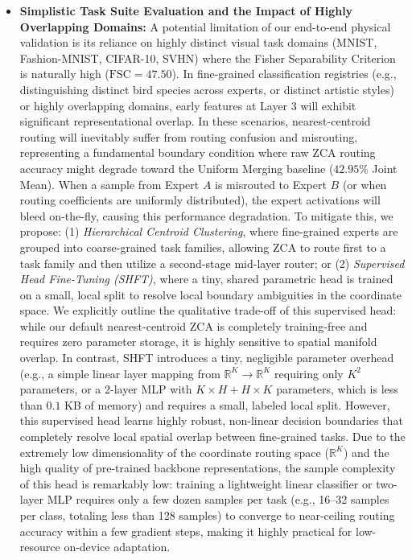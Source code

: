 \begin{itemize}
    \item \textbf{Simplistic Task Suite Evaluation and the Impact of Highly Overlapping Domains:} A potential limitation of our end-to-end physical validation is its reliance on highly distinct visual task domains (MNIST, Fashion-MNIST, CIFAR-10, SVHN) where the Fisher Separability Criterion is naturally high ($\text{FSC} = 47.50$).
In fine-grained classification registries (e.g., distinguishing distinct bird species across experts, or distinct artistic styles) or highly overlapping domains, early features at Layer 3 will exhibit significant representational overlap.
In these scenarios, nearest-centroid routing will inevitably suffer from routing confusion and misrouting, representing a fundamental boundary condition where raw ZCA routing accuracy might degrade toward the Uniform Merging baseline ($42.95\%$ Joint Mean).
When a sample from Expert $A$ is misrouted to Expert $B$ (or when routing coefficients are uniformly distributed), the expert activations will bleed on-the-fly, causing this performance degradation.
To mitigate this, we propose: (1) \emph{Hierarchical Centroid Clustering}, where fine-grained experts are grouped into coarse-grained task families, allowing ZCA to route first to a task family and then utilize a second-stage mid-layer router; or (2) \emph{Supervised Head Fine-Tuning (SHFT)}, where a tiny, shared parametric head is trained on a small, local split to resolve local boundary ambiguities in the coordinate space.
We explicitly outline the qualitative trade-off of this supervised head: while our default nearest-centroid ZCA is completely training-free and requires zero parameter storage, it is highly sensitive to spatial manifold overlap. In contrast, SHFT introduces a tiny, negligible parameter overhead (e.g., a simple linear layer mapping from $\mathbb{R}^K \to \mathbb{R}^K$ requiring only $K^2$ parameters, or a 2-layer MLP with $K \times H + H \times K$ parameters, which is less than $0.1$ KB of memory) and requires a small, labeled local split. However, this supervised head learns highly robust, non-linear decision boundaries that completely resolve local spatial overlap between fine-grained tasks.
Due to the extremely low dimensionality of the coordinate routing space ($\mathbb{R}^K$) and the high quality of pre-trained backbone representations, the sample complexity of this head is remarkably low: training a lightweight linear classifier or two-layer MLP requires only a few dozen samples per task (e.g., 16--32 samples per class, totaling less than 128 samples) to converge to near-ceiling routing accuracy within a few gradient steps, making it highly practical for low-resource on-device adaptation.

\end{itemize}
